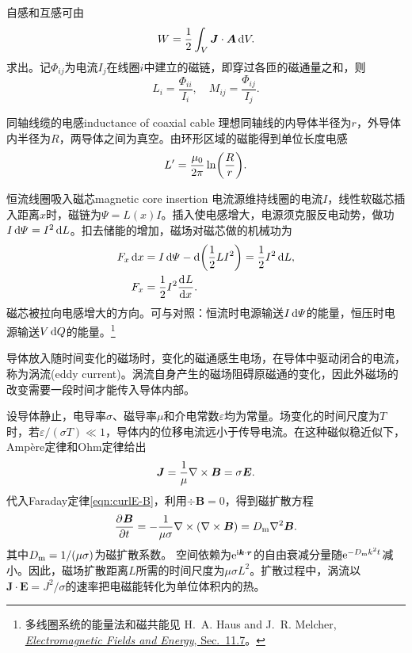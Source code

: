 自感和互感可由
\[
    W = \frac12\int_V\bm J \cdot \bm A\mathop{}\!\mathrm{d} V.
\]
求出。记$\varPhi_{ij}$为电流$I_j$在线圈$i$中建立的磁链，即穿过各匝的磁通量之和，则
\begin{equation}
    \label{eq:ed-flux-linkage-inductance}
    L_i = \frac{\varPhi_{ii}}{I_i},\quad M_{ij} = \frac{\varPhi_{ij}}{I_j}.
\end{equation}
\begin{example}
    {同轴线缆的电感}{inductance of coaxial cable}
    理想同轴线的内导体半径为$r$，外导体内半径为$R$，两导体之间为真空。由环形区域的磁能得到单位长度电感
    \begin{equation}
        L' = \frac{\mu_0}{2\pi}\ln\biggl(\frac Rr\biggr).
    \end{equation}
\end{example}
\begin{example}{恒流线圈吸入磁芯}{magnetic core insertion}
    电流源维持线圈的电流$I$，线性软磁芯插入距离$x$时，磁链为$\varPsi = L(x)I$。插入使电感增大，电源须克服反电动势，做功$I\mathop{}\!\mathrm{d}\varPsi = I^2\mathop{}\!\mathrm{d} L$。扣去储能的增加，磁场对磁芯做的机械功为
    \begin{equation}
        \label{eq:ed-fixed-current-magnetic-force}
        \begin{aligned}
            F_x\mathop{}\!\mathrm{d} x &= I\mathop{}\!\mathrm{d}\varPsi - \mathop{}\!\mathrm{d}\biggl(\frac12 LI^2\biggr) = \frac12 I^2\mathop{}\!\mathrm{d} L,\\
            F_x &= \frac12 I^2\frac{\mathop{}\!\mathrm{d}^{}L}{\mathrm{d}{x}^{}} .
        \end{aligned}
    \end{equation}
    磁芯被拉向电感增大的方向。可与对照：恒流时电源输送$I\mathop{}\!\mathrm{d}\varPsi$的能量，恒压时电源输送$V\mathop{}\!\mathrm{d} Q$的能量。\footnote{多线圈系统的能量法和磁共能见 H.~A. Haus and J.~R. Melcher, \href{https://web.mit.edu/6.013_book/www/chapter11/11.7.html}{\textit{Electromagnetic Fields and Energy}, Sec.~11.7}。}
\end{example}

\label{sec:quasi-static field}

导体放入随时间变化的磁场时，变化的磁通感生电场，在导体中驱动闭合的电流，称为涡流(eddy current)。涡流自身产生的磁场阻碍原磁通的变化，因此外磁场的改变需要一段时间才能传入导体内部。

设导体静止，电导率$\sigma$、磁导率$\mu$和介电常数$\varepsilon$均为常量。场变化的时间尺度为$T$时，若$\varepsilon/(\sigma T) \ll 1$，导体内的位移电流远小于传导电流。在这种磁似稳近似下，Ampère定律和Ohm定律给出
\[
    \bm J = \frac1\mu\nabla\times\bm B = \sigma\bm E.
\]
代入Faraday定律\eqref{eqn:curlE-B}，利用$\div\bm B = 0$，得到磁扩散方程
\begin{equation}
    \label{eqn:magnetic diffusion}
    \frac{\partial^{}\bm B}{\partial{t}^{}} = -\frac1{\mu\sigma}\nabla\times(\nabla\times\bm B)
    = D_\mathrm m\nabla^2\bm B.
\end{equation}
其中$D_\mathrm m = 1/(\mu\sigma)$为磁扩散系数。
空间依赖为$\mathop{}\!\mathrm{e}^{\mathrm{i}\bm k\cdot\bm r}$的自由衰减分量随$\mathop{}\!\mathrm{e}^{-D_\mathrm m k^2 t}$减小。因此，磁场扩散距离$L$所需的时间尺度为$\mu\sigma L^2$。扩散过程中，涡流以$\bm J \cdot \bm E = J^2/\sigma$的速率把电磁能转化为单位体积内的热。

